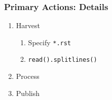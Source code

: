 \begin{frame}
	\frametitle{Primary Actions: Details}
	\begin{enumerate}
		\item Harvest  
		\begin{enumerate}
			\item Specify \texttt{*.rst}
			\item \texttt{read().splitlines()}
		\end{enumerate}
		\item Process  
		\item Publish  
	\end{enumerate}
\end{frame}

\endinput  %




%

%

%			



